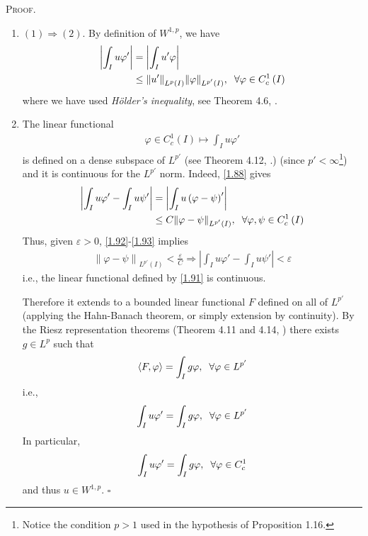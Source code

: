\documentclass[a4paper,oneside]{book}
\numberwithin{equation}{chapter}
\begin{document}
\textsc{Proof.} 
\begin{enumerate}
\item $\left( 1 \right) \Rightarrow \left( 2 \right)$.  By definition of $W^{1,p}$, we have
\begin{align}
\left| {\int_I {u\varphi '} } \right|& = \left| {\int_I {u'\varphi } } \right|\\
& \le {\left\| {u'} \right\|_{{L^p}\left( I \right)}}{\left\| \varphi  \right\|_{{L^{p'}}\left( I \right)}},\hspace{0.2cm}\forall \varphi  \in C_c^1\left( I \right)
\end{align}
where we have used \textit{H\"{o}lder's inequality}, see Theorem 4.6, \cite{1}.
\item The linear functional
\begin{align}
\label{1.91}
\varphi  \in C_c^1\left( I \right) \mapsto \int_I {u\varphi '} 
\end{align}
is defined on a dense subspace of $L^{p'}$ (see Theorem 4.12, \cite{1}.) (since $p'<\infty$\footnote{Notice the condition $p>1$ used in the hypothesis of Proposition 1.16.}) and it is continuous for the $L^{p'}$ norm. Indeed, \eqref{1.88} gives
\begin{align}
\label{1.92}
\left| {\int_I {u\varphi '}  - \int_I {u\psi '} } \right| &= \left| {\int_I {u\left( {\varphi  - \psi } \right)'} } \right|\\
& \le C{\left\| {\varphi  - \psi } \right\|_{{L^{p'}}\left( I \right)}},\hspace{0.2cm}\forall \varphi ,\psi  \in C_c^1\left( I \right) \label{1.93}
\end{align}
Thus, given $\varepsilon >0$, \eqref{1.92}-\eqref{1.93} implies
\begin{align}
{\left\| {\varphi  - \psi } \right\|_{{L^{p'}}\left( I \right)}} < \frac{\varepsilon }{C} \Rightarrow \left| {\int_I {u\varphi '}  - \int_I {u\psi '} } \right| < \varepsilon 
\end{align}
i.e., the linear functional defined by \eqref{1.91} is continuous. 

Therefore it extends to a bounded linear functional $F$ defined on all of $L^{p'}$ (applying the Hahn-Banach theorem, or simply extension by continuity). By the Riesz representation theorems (Theorem 4.11 and 4.14, \cite{1}) there exists $g\in L^p$ such that
\begin{align}
\left\langle {F,\varphi } \right\rangle  = \int_I {g\varphi } ,\hspace{0.2cm}\forall \varphi  \in {L^{p'}}
\end{align}
i.e.,
\begin{align}
\int_I {u\varphi '}  = \int_I {g\varphi } ,\hspace{0.2cm} \forall \varphi  \in {L^{p'}}
\end{align}
In particular,
\begin{align}
\int_I {u\varphi '}  = \int_I {g\varphi } ,\hspace{0.2cm} \forall \varphi  \in C_c^1
\end{align}
and thus $u\in W^{1,p}$. \hfill $\square$
\end{enumerate}
\end{document}
